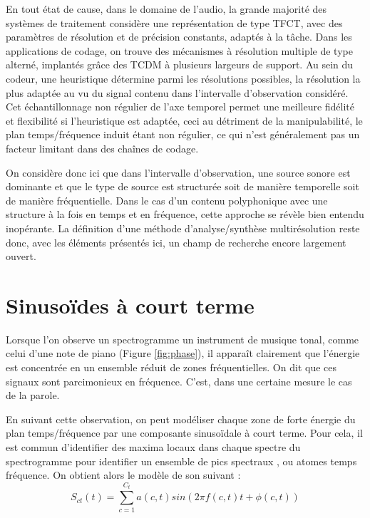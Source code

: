 En tout état de cause, dans le domaine de l'audio, la grande majorité des systèmes de traitement considère une représentation de type TFCT, avec des paramètres de résolution et de précision constants, adaptés à la tâche. Dans les applications de codage, on trouve des mécanismes à résolution multiple de type alterné, implantés grâce des TCDM à plusieurs largeurs de support\cite{brandenburg1999mp3}. Au sein du codeur, une heuristique détermine parmi les résolutions possibles, la résolution la plus adaptée au vu du signal contenu dans l'intervalle d'observation considéré. Cet échantillonnage non régulier de l'axe temporel permet une meilleure fidélité et flexibilité si l'heuristique est adaptée, ceci au détriment de la manipulabilité, le plan temps/fréquence induit étant non régulier, ce qui n'est généralement pas un facteur limitant dans des chaînes de codage.

On considère donc ici que dans l'intervalle d'observation, une source sonore est dominante et que le type de source est structurée soit de manière temporelle soit de manière fréquentielle. Dans le cas d'un contenu polyphonique avec une structure à la fois en temps et en fréquence, cette approche se révèle bien entendu inopérante. La définition d'une méthode d'analyse/synthèse multirésolution reste donc, avec les éléments présentés ici, un champ de recherche encore largement ouvert.

\section{ \nmu Sinusoïdes à court terme}  \label{sec:sct}

Lorsque l'on observe un spectrogramme un instrument de musique tonal, comme celui d'une note de piano (Figure \ref{fig:phase}), il apparaît clairement que l'énergie est concentrée en un ensemble réduit de zones fréquentielles. On dit que ces signaux sont parcimonieux en fréquence. C'est, dans une certaine mesure le cas de la parole.

En suivant cette observation, on peut modéliser chaque zone de forte énergie du plan temps/fréquence par une composante sinusoïdale à court terme. Pour cela, il est commun d'identifier des maxima locaux dans chaque spectre du spectrogramme pour identifier un ensemble de \og pics spectraux \fg, ou \og atomes \fg temps fréquence. On obtient alors le modèle de son suivant :
\begin{equation}
  S_{ct}(t) = \sum_{c=1}^{C_t} a(c,t) sin(2 \pi f(c,t) t + \phi(c,t))
\end{equation}

